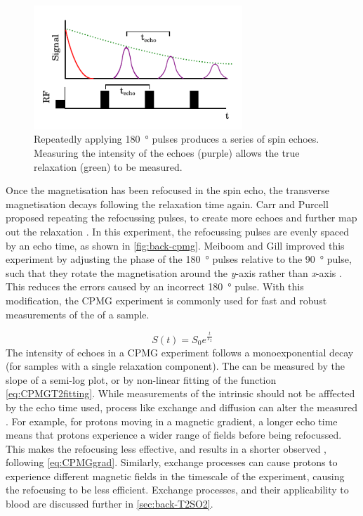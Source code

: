 \begin{figure}[t]
\centering
\includegraphics[width=0.7\textwidth]{figures/background/cpmg.pdf}
\caption[CPMG pulse sequence]{Repeatedly applying \SI{180}{\degree} pulses produces a series of spin echoes. Measuring the intensity of the echoes (purple) allows the true \Ttwo relaxation (green) to be measured.}
\label{fig:back-cpmg}
\end{figure}

Once the magnetisation has been refocused in the spin echo, the transverse magnetisation decays following the \Ttwostar relaxation time again.
Carr and Purcell proposed repeating the refocussing pulses, to create more echoes and further map out the \Ttwo relaxation \cite{CarrEffectsDiffusionFree1954}.
In this experiment, the refocussing pulses are evenly spaced by an echo time, as shown in \autoref{fig:back-cpmg}.
Meiboom and Gill improved this experiment by adjusting the phase of the \SI{180}{\degree} pulses relative to the \SI{90}{\degree} pulse, such that they rotate the magnetisation around the \textit{y}-axis rather than \textit{x}-axis \cite{MeiboomModifiedSpinEcho1958}.
This reduces the errors caused by an incorrect \SI{180}{\degree} pulse.
With this modification, the CPMG experiment is commonly used for fast and robust measurements of the \Ttwo of a sample.

\begin{equation}
S(t) = S_0 e^{\frac{t}{T_2}}
\label{eq:CPMGT2fitting}
\end{equation}
The intensity of echoes in a CPMG experiment follows a monoexponential decay (for samples with a single relaxation component).
The \Ttwo can be measured by the slope of a semi-log plot, or by non-linear fitting of the function \ref{eq:CPMGT2fitting}.
While measurements of the intrinsic \Ttwo should not be afffected by the echo time used, process like exchange and diffusion can alter the measured \Ttwo.
For example, for protons moving in a magnetic gradient, a longer echo time means that protons experience a wider range of \Bzero fields before being refocussed.
This makes the refocusing less effective, and results in a shorter observed \Ttwo, following \autoref{eq:CPMGgrad}.
Similarly, exchange processes can cause protons to experience different magnetic fields in the timescale of the experiment, causing the refocusing to be less efficient.
Exchange processes, and their applicability to blood are discussed further in \autoref{sec:back-T2SO2}.

